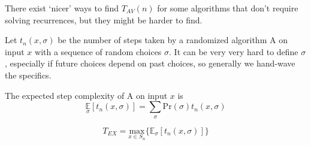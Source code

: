 There exist `nicer' ways to find $T_{AV}(n)$ for some algorithms that don't require solving recurrences, but they might be harder to find. 

Let $t_n(x, \sigma)$ be the number of steps taken by a randomized algorithm \textsc{A} on input $x$ with a sequence of random choices $\sigma$. It can be very very hard to define $\sigma$, especially if future choices depend on past choices, so generally we hand-wave the specifics.
\begin{definition}
    The expected step complexity of \textsc{A} on input $x$ is
    \[
    \underset{\sigma}{\mathbb{E}} [t_n(x, \sigma)] = \sum_ \sigma \text{Pr}(\sigma) t_n(x, \sigma)
    \]
\end{definition}
\begin{definition}
\[
    T_{EX} = \underset{x \in S_n}{\text{max}} \{  \mathbb{E}_ \sigma [t_n(x, \sigma)] \}
\]
\end{definition}
